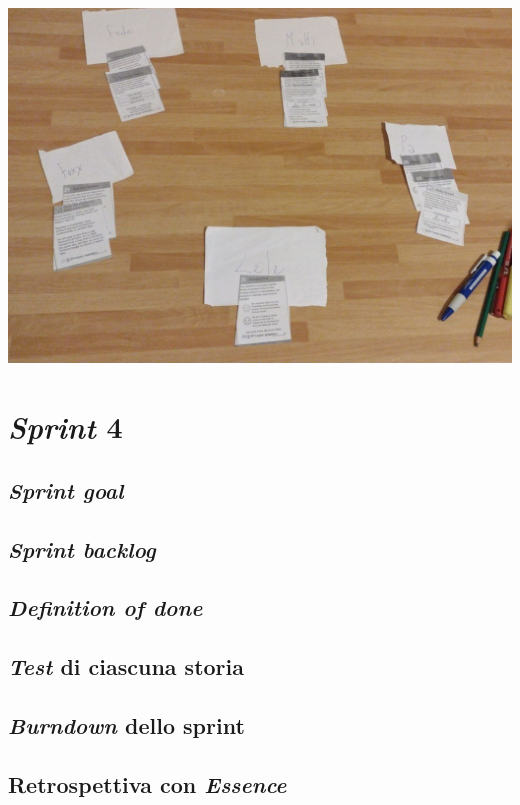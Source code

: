 \documentclass{article}
\begin{document}
\includegraphics[width=\textwidth]{essence-3}

\section{\emph{Sprint} 4}

\subsection{\emph{Sprint goal}}

\subsection{\emph{Sprint backlog}}

\subsection{\emph{Definition of done}}

\subsection{\emph{Test} di ciascuna storia}

\subsection{\emph{Burndown} dello sprint}

\subsection{Retrospettiva con \emph{Essence}}
\end{document}
